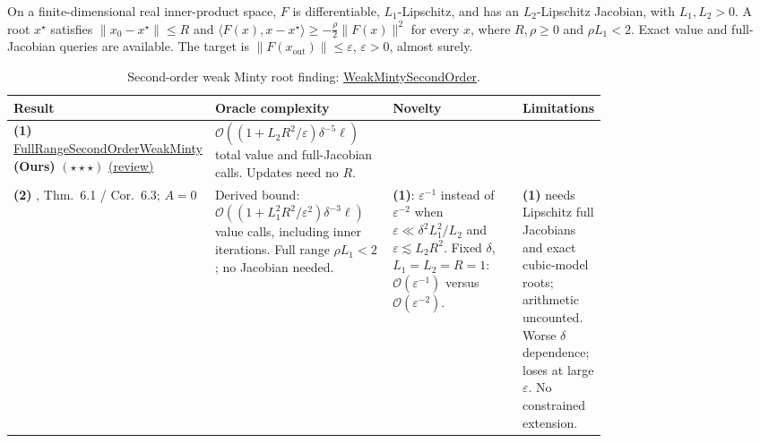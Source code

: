 \begin{table}[tp]
\centering
\caption{Second-order weak Minty root finding: \href{https://github.com/k3nfalt/longtails/blob/main/LongTails/Setups/WeakMintySecondOrder.lean}{WeakMintySecondOrder}.}\label{tab:WeakMintySecondOrder}
\parbox{\linewidth}{\footnotesize On a finite-dimensional real inner-product space, $F$ is differentiable, $L_1$-Lipschitz, and has an $L_2$-Lipschitz Jacobian, with $L_1,L_2>0$. A root $x^\star$ satisfies $\|x_0-x^\star\|\le R$ and $\langle F(x),x-x^\star\rangle\ge-\frac{\rho}{2}\|F(x)\|^2$ for every $x$, where $R,\rho\ge0$ and $\rho L_1<2$. Exact value and full-Jacobian queries are available. The target is $\|F(x_{\mathrm{out}})\|\le\varepsilon$, $\varepsilon>0$, almost surely.}\par\smallskip
\begin{threeparttable}
\footnotesize
\setlength{\tabcolsep}{4pt}\renewcommand{\arraystretch}{1.25}
\begin{tabularx}{\linewidth}{@{}>{\raggedright\arraybackslash}p{0.20\linewidth}>{\raggedright\arraybackslash}p{0.32\linewidth}>{\raggedright\arraybackslash}p{0.25\linewidth}>{\raggedright\arraybackslash}X@{}}
\toprule
\textbf{Result} & \textbf{Oracle complexity} & \textbf{Novelty} & \textbf{Limitations} \\
\midrule
\textbf{(1)} \href{https://github.com/k3nfalt/longtails/blob/main/LongTails/Theorems/FullRangeSecondOrderWeakMinty.lean}{Full\allowbreak{}Range\allowbreak{}Second\allowbreak{}Order\allowbreak{}Weak\allowbreak{}Minty} \textbf{(Ours)} $(\star\star\star)$ \href{https://github.com/k3nfalt/longtails/blob/main/scripts/reviews/FullRangeSecondOrderWeakMinty.md}{(review)}
& $\mathcal{O}\!\left((1+L_2R^2/\varepsilon)\delta^{-5}\ell\right)$ total value and full-Jacobian calls. Updates need no $R$.
& & \\
\midrule[1.2pt]
\textbf{(2)} \citep{wmsoPethick2025}, Thm.~6.1 / Cor.~6.3; $A=0$
& Derived bound: $\mathcal{O}\!\left((1+L_1^2R^2/\varepsilon^2)\delta^{-3}\ell\right)$ value calls, including inner iterations. Full range $\rho L_1<2$; no Jacobian needed.
& \textbf{(1)}: $\varepsilon^{-1}$ instead of $\varepsilon^{-2}$ when $\varepsilon\ll\delta^2L_1^2/L_2$ and $\varepsilon\lesssim L_2R^2$. Fixed $\delta$, $L_1=L_2=R=1$: $\mathcal{O}(\varepsilon^{-1})$ versus $\mathcal{O}(\varepsilon^{-2})$.
& \textbf{(1)} needs Lipschitz full Jacobians and exact cubic-model roots; arithmetic uncounted. Worse $\delta$ dependence; loses at large $\varepsilon$. No constrained extension. \\

\end{tabularx}
\end{threeparttable}
\end{table}
